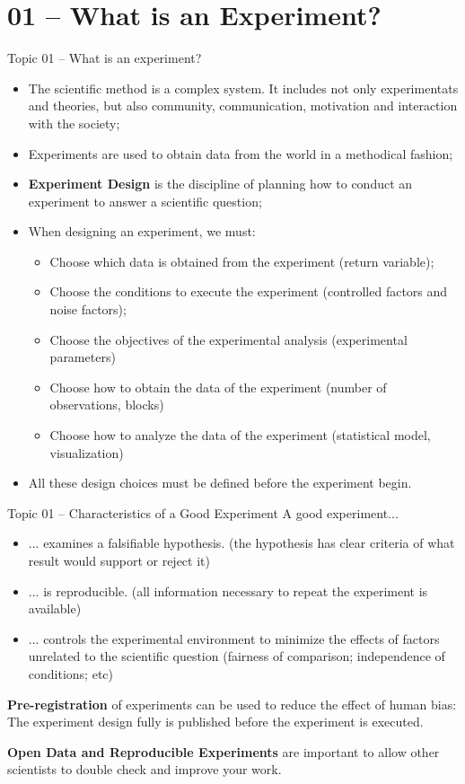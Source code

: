 \section{01 -- What is an Experiment?}

\begin{frame}[t]{Topic 01 -- What is an experiment?}
  \begin{itemize}
    \item The scientific method is a complex system. It includes not only experimentats and theories, but also community, communication, motivation and interaction with the society;

    \item Experiments are used to obtain data from the world in a methodical fashion;

    \item {\bf Experiment Design} is the discipline of planning how to conduct an experiment to answer a scientific question;
    \item When designing an experiment, we must:
    \begin{itemize}
      \item Choose which data is obtained from the experiment (return variable);
      \item Choose the conditions to execute the experiment (controlled factors and noise factors);
      \item Choose the objectives of the experimental analysis (experimental parameters)
      \item Choose how to obtain the data of the experiment (number of observations, blocks)
      \item Choose how to analyze the data of the experiment (statistical model, visualization)
    \end{itemize}
    \item All these design choices must be defined before the experiment begin.
  \end{itemize}
\end{frame}

\begin{frame}[t]{Topic 01 -- Characteristics of a Good Experiment}
  A good experiment...
  \begin{itemize}
    \item ... examines a falsifiable hypothesis. (the hypothesis has clear criteria of what result would support or reject it)
    \item ... is reproducible. (all information necessary to repeat the experiment is available)
    \item ... controls the experimental environment to minimize the effects of factors unrelated to the scientific question (fairness of comparison; independence of conditions; etc)
  \end{itemize}\bigskip

  {\bf Pre-registration} of experiments can be used to reduce the effect of human bias: The experiment design fully is published before the experiment is executed.

  {\bf Open Data and Reproducible Experiments} are important to allow other scientists to double check and improve your work.
\end{frame}
